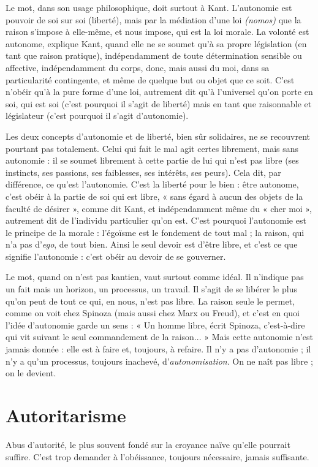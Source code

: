 Le mot, dans son usage philosophique, doit surtout à Kant. L’autonomie
est pouvoir de soi sur soi (liberté), mais par la médiation d’une loi {\it (nomos)}
que la raison s'impose à elle-même, et nous impose, qui est la loi morale. La
volonté est autonome, explique Kant, quand elle ne se soumet qu'à sa
propre législation (en tant que raison pratique), indépendamment de toute
détermination sensible ou affective, indépendamment du corps, donc, mais
aussi du moi, dans sa particularité contingente, et même de quelque but ou
objet que ce soit. C’est n’obéir qu’à la pure forme d’une loi, autrement dit
qu’à l’universel qu’on porte en soi, qui est soi (c’est pourquoi il s’agit de
liberté) mais en tant que raisonnable et législateur (c’est pourquoi il s’agit
d'autonomie).

Les deux concepts d’autonomie et de liberté, bien sûr solidaires, ne se
recouvrent pourtant pas totalement. Celui qui fait le mal agit certes librement,
mais sans autonomie : il se soumet librement à cette partie de lui qui n’est pas
libre (ses instincts, ses passions, ses faiblesses, ses intérêts, ses peurs). Cela dit,
par différence, ce qu’est l'autonomie. C’est la liberté pour le bien : être autonome,
c’est obéir à la partie de soi qui est libre, « sans égard à aucun des objets
de la faculté de désirer », comme dit Kant, et indépendamment même du
« cher moi », autrement dit de l’individu particulier qu’on est. C’est pourquoi
l’autonomie est le principe de la morale : l’égoïsme est le fondement de tout
mal ; la raison, qui n’a pas d’{\it ego}, de tout bien. Ainsi le seul devoir est d’être
libre, et c’est ce que signifie l’autonomie : c’est obéir au devoir de se gouverner.

Le mot, quand on n’est pas kantien, vaut surtout comme idéal. Il n’indique
pas un fait mais un horizon, un processus, un travail. Il s’agit de se libérer le
plus qu’on peut de tout ce qui, en nous, n’est pas libre. La raison seule le
permet, comme on voit chez Spinoza (mais aussi chez Marx ou Freud), et c’est
en quoi l’idée d'autonomie garde un sens : « Un homme libre, écrit Spinoza,
c’est-à-dire qui vit suivant le seul commandement de la raison... » Mais cette
autonomie n’est jamais donnée : elle est à faire et, toujours, à refaire. Il n’y a
pas d’autonomie ; il n’y a qu’un processus, toujours inachevé, d’{\it autonomisation}.
On ne naît pas libre ; on le devient.

\section{Autoritarisme}
Abus d'autorité, le plus souvent fondé sur la croyance
naïve qu’elle pourrait suffire. C’est trop demander à
l’obéissance, toujours nécessaire, jamais suffisante.

